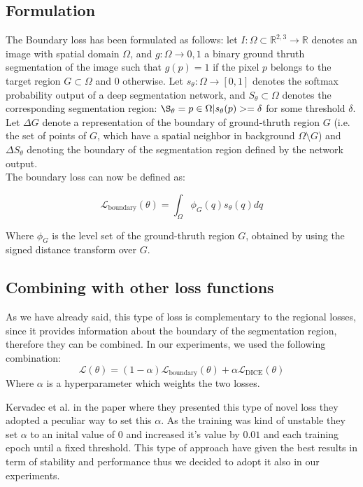 \subsection{Formulation}
The Boundary loss has been formulated as follows:
let $I: \Omega \subset \mathbb{R}^{2,3} \rightarrow \mathbb{R}$ denotes an image
with spatial domain $\Omega$, and $g: \Omega \rightarrow {0,1}$ a binary ground
thruth segmentation of the image such that $g(p) = 1$ if the pixel $p$ belongs
to the target region $G \subset \Omega$ and $0$ otherwise. Let $s_\theta :
\Omega \rightarrow [0,1]$ denotes the softmax probability output of a deep
segmentation network, and $S_\theta \subset \Omega$ denotes the corresponding
segmentation region: $\S_\theta = {p \in \Omega | s_\theta(p) >= \delta}$ for
some threshold $\delta$. Let $\Delta G$ denote a representation of the boundary
of ground-thruth region $G$ (i.e. the set of points of $G$, which have a spatial
neighbor in background $\Omega \setminus G$) and $\Delta S_\theta$ denoting the
boundary of the segmentation region defined by the network output.\\
The boundary loss can now be defined as:

\begin{equation}
  \label{eq:boundaryloss}
  \mathcal{L}_{\text{boundary}}(\theta) = \int_{\Omega} \phi_G(q)s_\theta(q)dq
\end{equation}

Where $\phi_G$ is the level set of the ground-thruth region $G$, obtained by
using the signed distance transform over $G$.

\subsection{Combining with other loss functions}
As we have already said, this type of loss is complementary to the regional
losses, since it provides information about the boundary of the segmentation
region, therefore they can be combined. In our experiments, we used the
following combination:
\begin{equation}
  \label{eq:boundaryloss}
  \mathcal{L}(\theta) = (1-\alpha)\mathcal{L}_{\text{boundary}}(\theta) + \alpha\mathcal{L}_{\text{DICE}}(\theta)
\end{equation}
Where $\alpha$ is a hyperparameter which weights the two losses.

Kervadec et al. in the paper where they presented this type of novel loss they
adopted a peculiar way to set this $\alpha$. As the training was kind of
unstable they set $\alpha$ to an inital value of $0$ and increased it's value by
$0.01$ and each training epoch until a fixed threshold. This type of approach
have given the best results in term of stability and performance thus we decided
to adopt it also in our experiments.

